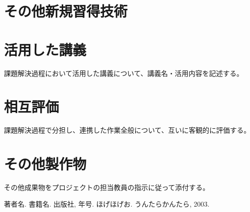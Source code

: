\documentclass[openany,11pt,papersize]{jsbook}
\begin{document}
\begin{appendix}

\chapter{その他新規習得技術}


\chapter{活用した講義}
\begin{hissu}
課題解決過程において活用した講義について、講義名・活用内容を記述する。
\end{hissu}

\chapter{相互評価}
\begin{hissu}
課題解決過程で分担し、連携した作業全般について、互いに客観的に評価する。
\end{hissu}

\chapter{その他製作物}
\begin{hissu}
その他成果物をプロジェクトの担当教員の指示に従って添付する。
\end{hissu}

\end{appendix}



\begin{thebibliography}{9}
  著者名. 書籍名. 出版社,  年号.
  ほげほげお. うんたらかんたら,  2003.
\end{thebibliography}
\end{document}
